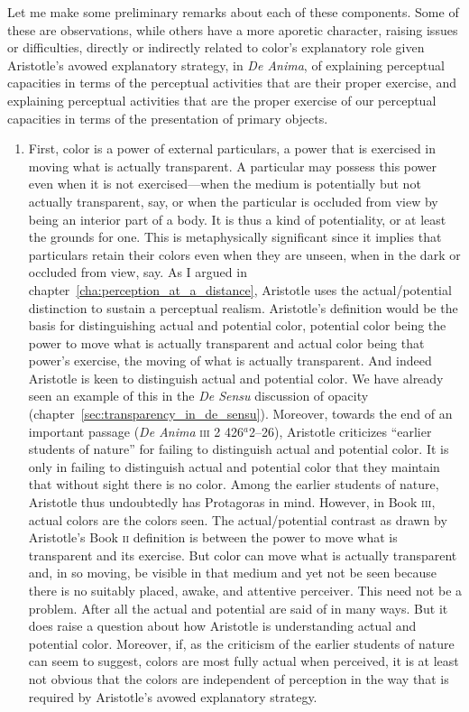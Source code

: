 Let me make some preliminary remarks about each of these components. Some of these are observations, while others have a more aporetic character, raising issues or difficulties, directly or indirectly related to color's explanatory role given Aristotle's avowed explanatory strategy, in \emph{De Anima}, of explaining perceptual capacities in terms of the perceptual activities that are their proper exercise, and explaining perceptual activities that are the proper exercise of our perceptual capacities in terms of the presentation of primary objects.
\begin{enumerate}[(1)]
	\item First, color is a power of external particulars, a power that is exercised in moving what is actually transparent. A particular may possess this power even when it is not exercised---when the medium is potentially but not actually transparent, say, or when the particular is occluded from view by being an interior part of a body. It is thus a kind of potentiality, or at least the grounds for one. This is metaphysically significant since it implies that particulars retain their colors even when they are unseen, when in the dark or occluded from view, say. As I argued in chapter~\ref{cha:perception_at_a_distance}, Aristotle uses the actual/potential distinction to sustain a perceptual realism. Aristotle's definition would be the basis for distinguishing actual and potential color, potential color being the power to move what is actually transparent and actual color being that power's exercise, the moving of what is actually transparent. And indeed Aristotle is keen to distinguish actual and potential color. We have already seen an example of this in the \emph{De Sensu} discussion of opacity (chapter~\ref{sec:transparency_in_de_sensu}). Moreover, towards the end of an important passage (\emph{De Anima} \textsc{iii} 2 426\( ^{a} \)2--26), Aristotle criticizes ``earlier students of nature'' for failing to distinguish actual and potential color. It is only in failing to distinguish actual and potential color that they maintain that without sight there is no color. Among the earlier students of nature, Aristotle thus undoubtedly has Protagoras in mind. However, in Book \textsc{iii}, actual colors are the colors seen. The actual/potential contrast as drawn by Aristotle's Book \textsc{ii} definition is between the power to move what is transparent and its exercise. But color can move what is actually transparent and, in so moving, be visible in that medium and yet not be seen because there is no suitably placed, awake, and attentive perceiver. This need not be a problem. After all the actual and potential are said of in many ways. But it does raise a question about how Aristotle is understanding actual and potential color. Moreover, if, as the criticism of the earlier students of nature can seem to suggest, colors are most fully actual when perceived, it is at least not obvious that the colors are independent of perception in the way that is required by Aristotle's avowed explanatory strategy.

\end{enumerate}
